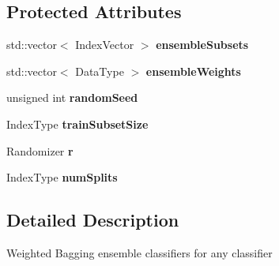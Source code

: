 \subsection*{Protected Attributes}
\begin{DoxyCompactItemize}
\item 
\hypertarget{classffactory_1_1_p_e_r_t_a2f6456fa7c6b6f5995a35d2beaa2a8ad}{std\-::vector$<$ Index\-Vector $>$ {\bfseries ensemble\-Subsets}}\label{classffactory_1_1_p_e_r_t_a2f6456fa7c6b6f5995a35d2beaa2a8ad}

\item 
\hypertarget{classffactory_1_1_p_e_r_t_a5eb6dc6c880e7ecc7f63860fb99d09b4}{std\-::vector$<$ Data\-Type $>$ {\bfseries ensemble\-Weights}}\label{classffactory_1_1_p_e_r_t_a5eb6dc6c880e7ecc7f63860fb99d09b4}

\item 
\hypertarget{classffactory_1_1_p_e_r_t_af63451cb13ae43eb8874d05a4a558f17}{unsigned int {\bfseries random\-Seed}}\label{classffactory_1_1_p_e_r_t_af63451cb13ae43eb8874d05a4a558f17}

\item 
\hypertarget{classffactory_1_1_p_e_r_t_aeb0eaa57b7bb0651635603a5087ab1c2}{Index\-Type {\bfseries train\-Subset\-Size}}\label{classffactory_1_1_p_e_r_t_aeb0eaa57b7bb0651635603a5087ab1c2}

\item 
\hypertarget{classffactory_1_1_p_e_r_t_ab8d234515517566eb3e073bf77e1a5f3}{Randomizer {\bfseries r}}\label{classffactory_1_1_p_e_r_t_ab8d234515517566eb3e073bf77e1a5f3}

\item 
\hypertarget{classffactory_1_1_p_e_r_t_a5694095a8ba39cdcf6beb06126c56d8b}{Index\-Type {\bfseries num\-Splits}}\label{classffactory_1_1_p_e_r_t_a5694095a8ba39cdcf6beb06126c56d8b}

\end{DoxyCompactItemize}


\subsection{Detailed Description}
Weighted Bagging ensemble classifiers for any classifier 

